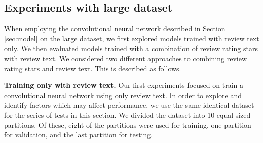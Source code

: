 \documentclass[conference,compsoc]{IEEEtran}
\begin{document}
\subsection{Experiments with large dataset}
When employing the convolutional neural network described in Section \ref{sec:model} on the large dataset, we first explored models trained with review text only. We then evaluated models trained with a combination of review rating stars with review text. We considered two different approaches to combining  review rating stars and review text. This is described as follows.

\textbf{Training only with review text.} Our first experiments focused on train a convolutional neural network using only review text. In order to explore and identify factors which may affect performance, we use the same identical dataset for the series of tests in this section. We divided the dataset into 10 equal-sized partitions. Of these, eight of the partitions were used for training, one partition for validation, and the last partition for testing.
\end{document}
